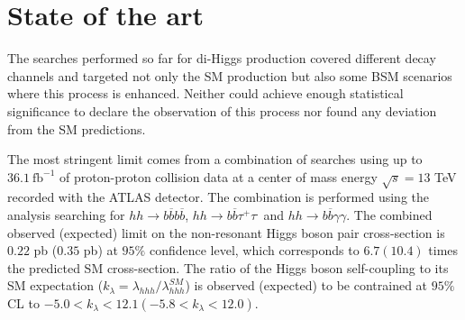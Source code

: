
\section{State of the art}
\label{sec:backg}


The searches performed so far for di-Higgs production covered different decay channels and targeted not only the SM production but also some BSM scenarios where this process is enhanced. Neither could achieve enough statistical significance to declare the observation of this process nor found any deviation from the SM predictions. 

The most stringent limit comes from a combination of searches using up to $36.1~\text{fb}^{-1}$ of proton-proton collision data at a center of mass energy $\sqrt{s}=13$ TeV recorded with the ATLAS detector. The combination is performed using the analysis searching for $hh\rightarrow b\overline{b}b\overline{b}$, $hh\rightarrow b\overline{b}\tau^+\tau^.$ and $hh\rightarrow b\overline{b}\gamma\gamma$. The combined observed (expected) limit on the non-resonant Higgs boson pair cross-section is $0.22$ pb ($0.35$ pb) at $95\%$ confidence level, which corresponds to $6.7 (10.4)$ times the predicted SM cross-section. The ratio of the Higgs boson self-coupling to its SM expectation ($k_{\lambda}=\lambda_{hhh}/\lambda_{hhh}^{SM}$) is observed (expected) to be contrained at $95\%$ CL to $-5.0<k_{\lambda}<12.1 (-5.8<k_{\lambda}<12.0)$.

